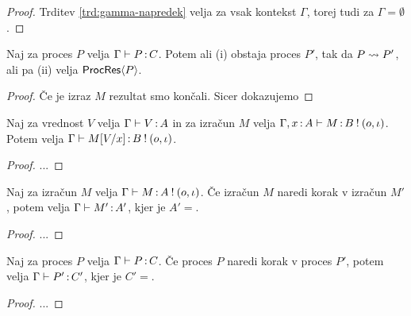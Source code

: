 \begin{proof}
	Trditev \ref{trd:gamma-napredek} velja za vsak kontekst $\Gamma$, torej tudi za $\Gamma = \emptyset$.
\end{proof}


\begin{izrek}[o napredku]
	Naj za proces $P$ velja $\Gamma \vdash P \mathinner{:} C$. Potem ali (i) obstaja proces $P'$, tak da $P \leadsto P'$, ali pa (ii) velja $\mathsf{ProcRes}\langle P \rangle$.
\end{izrek}

\begin{proof}
	Če je izraz $M$ rezultat smo končali. Sicer dokazujemo 
\end{proof}



\begin{lema}[o substituciji]
	Naj za vrednost $V$ velja $\Gamma \vdash V \mathinner{:} A$ in za izračun $M$ velja $\Gamma, x \mathinner{:} A \vdash M \mathinner{:} B \mathbin{!} (o, \iota)$. Potem velja $\Gamma \vdash M[V/x] \mathinner{:} B \mathbin{!} (o, \iota)$.
\end{lema}

\begin{proof}
	...
\end{proof}

\begin{trditev}[o ohranitvi]
	Naj za izračun $M$ velja $\Gamma \vdash M \mathinner{:} A \mathbin{!} (o, \iota)$. Če izračun $M$ naredi korak v izračun $M'$, potem velja $\Gamma \vdash M' \mathinner{:} A'$, kjer je $A' = $.
\end{trditev}

\begin{proof}
	...
\end{proof}

\begin{izrek}[o ohranitvi]
	Naj za proces $P$ velja $\Gamma \vdash P \mathinner{:} C$. Če proces $P$ naredi korak v proces $P'$, potem velja $\Gamma \vdash P' \mathinner{:} C'$, kjer je $C' = $.
\end{izrek}

\begin{proof}
	...
\end{proof}